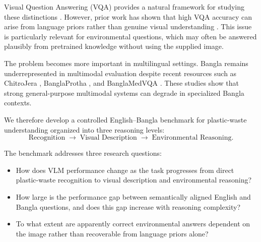 \documentclass{article}
\begin{document}
Visual Question Answering (VQA) provides a natural framework for studying these distinctions \citep{antol2015vqa}. However, prior work has shown that high VQA accuracy can arise from language priors rather than genuine visual understanding \citep{goyal2017makingv}. This issue is particularly relevant for environmental questions, which may often be answered plausibly from pretrained knowledge without using the supplied image.

The problem becomes more important in multilingual settings. Bangla remains underrepresented in multimodal evaluation despite recent resources such as ChitroJera \citep{barua2024chitrojera}, BanglaProtha \citep{fahim2026banglaprotha}, and BanglaMedVQA \citep{ahmed2026banglamedvqa}. These studies show that strong general-purpose multimodal systems can degrade in specialized Bangla contexts.

We therefore develop a controlled English--Bangla benchmark for plastic-waste understanding organized into three reasoning levels:
\begin{equation}
\text{Recognition}
\;\longrightarrow\;
\text{Visual Description}
\;\longrightarrow\;
\text{Environmental Reasoning}.
\label{eq:reasoning_hierarchy}
\end{equation}

The benchmark addresses three research questions:
\begin{itemize} \item[\textbf{RQ1.}] How does VLM performance change as the task progresses from direct plastic-waste recognition to visual description and environmental reasoning? \item[\textbf{RQ2.}] How large is the performance gap between semantically aligned English and Bangla questions, and does this gap increase with reasoning complexity? \item[\textbf{RQ3.}] To what extent are apparently correct environmental answers dependent on the image rather than recoverable from language priors alone? \end{itemize}
\end{document}
